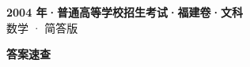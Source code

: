 \documentclass[zihao=-4, a4paper]{ctexart}
\begin{document}
\begin{center}
  {\Large\bfseries 2004 年·普通高等学校招生考试·福建卷·文科}\\[4pt]
  {\large 数学 · 简答版}
\end{center}
\medskip
{}

\clearpage
{}
\begin{center}{\Large\bfseries 答案速查}\end{center}
\medskip

\end{document}
